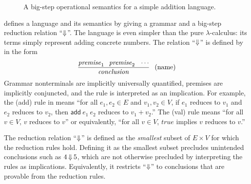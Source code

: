 \begin{figure}[tb]\centering
{}
\tab\tab
{}
\caption[Big-step operational semantics example]{A big-step operational semantics for a simple addition language.}
\label{fig:add-language}
\end{figure}

 defines a language and its semantics by giving a grammar and a big-step reduction relation ``$\operatorname{\Downarrow}$''.
The language is even simpler than the pure $\lambda$-calculus: its terms simply represent adding concrete numbers.
The relation ``$\operatorname{\Downarrow}$'' is defined by  in the form
\begin{equation}
	\dfrac{\mathit{premise}_1 \;\;\, \mathit{premise}_2 \;\;\, \cdots}{\mathit{conclusion}} \;\;\, \text{(name)}
\end{equation}
Grammar nonterminals are implicitly universally quantified, premises are implicitly conjuncted, and the rule is interpreted as an implication.
For example, the (add) rule in  means ``for all $e_1,e_2 \in E$ and $v_1,v_2 \in V$, if $e_1$ reduces to $v_1$ and $e_2$ reduces to $v_2$, then $\mathsf{add}~e_1~e_2$ reduces to $v_1 + v_2$.''
The (val) rule means ``for all $v \in V$, $v$ reduces to $v$'' or equivalently, ``for all $v \in V$, $\mathit{true}$ implies $v$ reduces to $v$.''

The reduction relation ``$\operatorname{\Downarrow}$'' is defined as the \emph{smallest} subset of $E \times V$ for which the reduction rules hold.
Defining it as the smallest subset precludes unintended conclusions such as $4 \operatorname{\Downarrow} 5$, which are not otherwise precluded by interpreting the rules as implications.
Equivalently, it restricts ``$\operatorname{\Downarrow}$'' to conclusions that are provable from the reduction rules.

